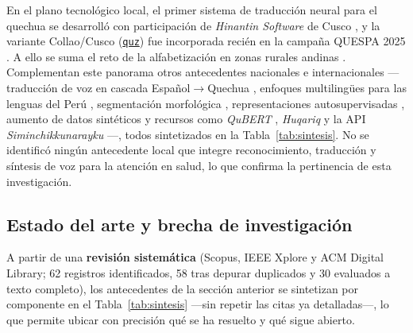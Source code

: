 \documentclass[12pt,a4paper]{article}
\newcommand{\obsdos}[1]{\textcolor{verdeOK}{#1}}
\DeclareRobustCommand{\sig}[1]{\hyperlink{sig:#1}{\texttt{#1}}}
\begin{document}
\noindent En el plano tecnol{\'o}gico local, el primer sistema de traducci{\'o}n neural para el
quechua se desarroll{\'o} con participaci{\'o}n de \emph{Hinantin Software} de Cusco
\parencite{ortega2020quechua}, y la variante Collao/Cusco (\sig{quz}) fue incorporada reci{\'e}n en
la campa{\~n}a QUESPA 2025 \parencite{Ortega2025260}. A ello se suma el reto de la alfabetizaci{\'o}n
en zonas rurales andinas \parencite{inei2023,dispurse2023}. \obsdos{Complementan este panorama otros
antecedentes nacionales e internacionales ---traducci{\'o}n de voz en cascada
Espa{\~n}ol$\to$Quechua \parencite{Alvarez-Crespo2023837}, enfoques multiling{\"u}es para las lenguas
del Per{\'u} \parencite{Veliz2021241,Oncevay2021194}, segmentaci{\'o}n morfol{\'o}gica
\parencite{Chen202120}, representaciones autosupervisadas \parencite{Chen20246444}, aumento de datos
sint{\'e}ticos \parencite{Gow-Smith2023192,Ahmed2023156,Dhawan2026119,Ebrahimi2024236} y recursos
como \emph{QuBERT} \parencite{Zevallos20221}, \emph{Huqariq} \parencite{zevallos2022huqariq} y la API
\emph{Siminchikkunarayku} \parencite{9514251}---, todos sintetizados en la Tabla~\ref{tab:sintesis}.}
No se identific{\'o} ning{\'u}n antecedente
local que integre reconocimiento, traducci{\'o}n y s{\'i}ntesis de voz para la atenci{\'o}n en salud,
lo que confirma la pertinencia de esta investigaci{\'o}n.

\subsection{Estado del arte y brecha de investigaci{\'o}n}
A partir de una \textbf{revisi{\'o}n sistem{\'a}tica} (Scopus, IEEE Xplore y ACM Digital Library;
62 registros identificados, 58 tras depurar duplicados y 30 evaluados a texto completo), los
antecedentes de la secci{\'o}n anterior se sintetizan por componente en el Tabla~\ref{tab:sintesis}
---sin repetir las citas ya detalladas---, lo que permite ubicar con precisi{\'o}n qu{\'e} se ha
resuelto y qu{\'e} sigue abierto.
\end{document}
